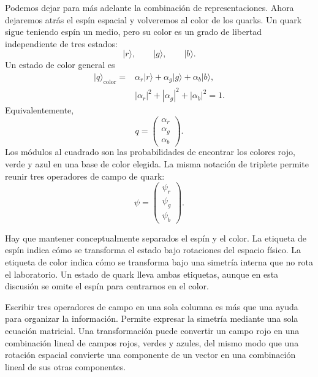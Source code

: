 Podemos dejar para más adelante la combinación de representaciones. Ahora dejaremos atrás el espín espacial y volveremos al color de los quarks. Un quark sigue teniendo espín un medio, pero su color es un grado de libertad independiente de tres estados:
\begin{equation}
\lvert r\rangle,\qquad
\lvert g\rangle,\qquad
\lvert b\rangle.
\end{equation}
Un estado de color general es
\begin{equation}
\begin{aligned}
\lvert q\rangle_{\mathrm{color}}
={}&
\alpha_r\lvert r\rangle
+\alpha_g\lvert g\rangle
+\alpha_b\lvert b\rangle,
\\
&|\alpha_r|^2+|\alpha_g|^2+|\alpha_b|^2=1.
\end{aligned}
\end{equation}
Equivalentemente,
\begin{equation}
q=
\begin{pmatrix}
\alpha_r\\
\alpha_g\\
\alpha_b
\end{pmatrix}.
\end{equation}
Los módulos al cuadrado son las probabilidades de encontrar los colores rojo, verde y azul en una base de color elegida. La misma notación de triplete permite reunir tres operadores de campo de quark:
\begin{equation}
\psi=
\begin{pmatrix}
\psi_r\\
\psi_g\\
\psi_b
\end{pmatrix}.
\end{equation}

Hay que mantener conceptualmente separados el espín y el color. La etiqueta de espín indica cómo se transforma el estado bajo rotaciones del espacio físico. La etiqueta de color indica cómo se transforma bajo una simetría interna que no rota el laboratorio. Un estado de quark lleva ambas etiquetas, aunque en esta discusión se omite el espín para centrarnos en el color.

Escribir tres operadores de campo en una sola columna es más que una ayuda para organizar la información. Permite expresar la simetría mediante una sola ecuación matricial. Una transformación puede convertir un campo rojo en una combinación lineal de campos rojos, verdes y azules, del mismo modo que una rotación espacial convierte una componente de un vector en una combinación lineal de sus otras componentes.

